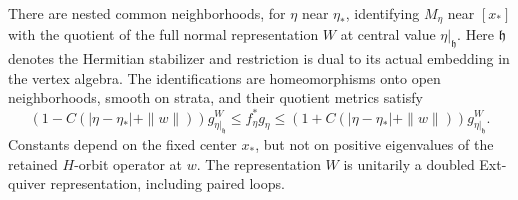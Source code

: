 \begin{theorem}\label{thm:metric-slice}
There are nested common neighborhoods, for $\eta$ near $\eta_*$,
identifying $M_\eta$ near $[x_*]$ with the quotient of the full normal
representation $W$ at central value $\eta|_{\mathfrak h}$.
Here $\mathfrak h$ denotes the Hermitian stabilizer and restriction
is dual to its actual embedding in the vertex algebra.
The identifications are homeomorphisms onto open neighborhoods,
smooth on strata, and their quotient metrics satisfy
\begin{equation}\label{eq:slice-metric}
 (1-C(|\eta-\eta_*|+\|w\|))g^W_{\eta|_{\mathfrak h}}
 \le f_\eta^*g_\eta
 \le(1+C(|\eta-\eta_*|+\|w\|))g^W_{\eta|_{\mathfrak h}}.
\end{equation}
Constants depend on the fixed center $x_*$, but not on positive
eigenvalues of the retained $H$-orbit operator at $w$.
The representation $W$ is unitarily a doubled Ext-quiver representation,
including paired loops.
\end{theorem}
